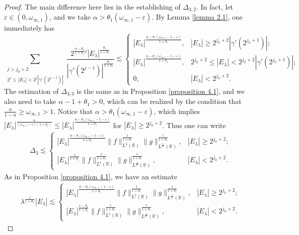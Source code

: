 \documentclass[11pt, twoside, leqno]{article}
\theoremstyle{definition}
\numberwithin{equation}{section}
\begin{document}
\begin{proof}
The main difference here lies in the establishing of $\Delta_{3,2}$. In fact, let $\varepsilon\in(0,\omega_{\infty,1})$, and we take $\alpha>\theta_{1}(\omega_{\infty,1}-\varepsilon)$. By Lemma \ref{lemma 2.1}, one immediately has
$$\sum\limits_{  \substack{j>j_{0}+2   \\2^j\leq|E_\lambda|<2^j|\gamma'(2^{j-1})|  }}   {\frac{2^{{\frac{\alpha-\theta_{1}}{1+\theta_{1}}}j}|E_\lambda|^{\frac{\theta_{1}}{1+\theta_{1}}}}{|\gamma'(2^{j-1})|^{\frac{\theta_{1}}{1+\theta_{1}}}}} \lesssim
\begin{cases}
  |E_\lambda|^{{\frac{\alpha-\theta_1(\omega_{\infty,1}-1-\varepsilon)}{1+\theta_1}}}, & |E_\lambda|\geq2^{j_0+2}|\gamma'(2^{j_{0}+1})|;\\
   |E_\lambda|^{{\frac{\alpha-\theta_1(\omega_{\infty,1}-1-\varepsilon)}{1+\theta_1}}}, & 2^{j_0+2}\leq|E_{\lambda}|<2^{j_0+2}|\gamma'(2^{j_{0}+1})|;\\
 0, &|E_{\lambda}|<2^{j_0+2}.
\end{cases}$$
The estimation of $\Delta_{3,3}$ is the same as in Proposition \ref{proposition 4.1}, and we also need to take $\alpha-1+\theta_{1}>0$, which can be realized by the condition that $\frac{\alpha}{1-\alpha}\geq \omega_{\infty,1}>1$. Notice that $\alpha>\theta_{1}(\omega_{\infty,1}-\varepsilon)$, which implies $|E_\lambda|^{\frac{\alpha}{(\omega_{\infty,1}-\varepsilon)(1+\theta_{1})}}\leq|E_\lambda|^{{\frac{\alpha-\theta_1(\omega_{\infty,1}-1-\varepsilon)}{1+\theta_1}}}$ for $|E_\lambda|\geq2^{j_0+2}$. Thus one can write
\begin{align*}
\Delta_{3}\lesssim
\begin{cases}
  |E_\lambda|^{{\frac{\alpha-\theta_1(\omega_{\infty,1}-1-\varepsilon)}{1+\theta_1}}}
 \|f\|_{L^{1}(\mathbb{R})}^{\frac{1}{1+\theta_{1}}}\|g\|_{L^{\frac{1}{\theta_1}}(\mathbb{R})}^{\frac{1}{1+\theta_{1}}}, & |E_\lambda|\geq2^{j_0+2}; \\
  |E_\lambda|^{{\frac{1}{1+\theta_{1}}}}
\|f\|_{L^{1}(\mathbb{R})}^{\frac{1}{1+\theta_{1}}}\|g\|_{L^{\frac{1}{\theta_1}}(\mathbb{R})}^{\frac{1}{1+\theta_{1}}}, &|E_{\lambda}|<2^{j_0+2}.
\end{cases}
\end{align*}
As in Proposition \ref{proposition 4.1}, we have an estimate
\begin{align}\label{eq:4.19}
\lambda^{\frac{1}{1+\theta_{1}}}|E_{\lambda}|\lesssim
\begin{cases}
   |E_\lambda|^{{\frac{\alpha-\theta_1(\omega_{\infty,1}-1-\varepsilon)}{1+\theta_1}}}
 \|f\|_{L^{1}(\mathbb{R})}^{\frac{1}{1+\theta_{1}}}\|g\|_{L^{\frac{1}{\theta_1}}(\mathbb{R})}^{\frac{1}{1+\theta_{1}}}, & |E_\lambda|\geq2^{j_0+2}; \\
 |E_\lambda|^{\frac{1-\theta_{1}}{1+\theta_{1}}}
\|f\|_{L^{1}(\mathbb{R})}^{\frac{1}{1+\theta_{1}}}\|g\|_{L^{\frac{1}{\theta_1}}(\mathbb{R})}^{\frac{1}{1+\theta_{1}}}, &|E_{\lambda}|<2^{j_0+2}.
\end{cases}
\end{align}


\end{proof}
\end{document}
